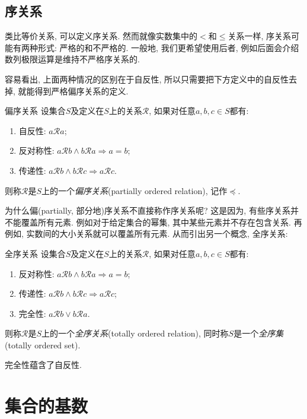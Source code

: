\subsection{序关系}

类比等价关系, 可以定义序关系. 然而就像实数集中的$<$和$\leq$关系一样, 序关系可能有两种形式: 严格的和不严格的. 一般地, 我们更希望使用后者, 例如后面会介绍数列极限运算是维持不严格序关系的. 

容易看出, 上面两种情况的区别在于自反性, 所以只需要把下方定义中的自反性去掉, 就能得到严格偏序关系的定义. 

\begin{definition}{偏序关系}
	设集合$S$及定义在$S$上的关系$\mathcal{R}$, 如果对任意$a, b, c \in S$都有: 
	\begin{enumerate}
		\item 自反性: $a\mathcal{R} a$; 
		\item 反对称性: $a\mathcal{R} b \wedge b\mathcal{R} a \Rightarrow a=b$; 
		\item 传递性: $a\mathcal{R} b \wedge b\mathcal{R} c \Rightarrow a\mathcal{R} c$.
	\end{enumerate}
	则称$\mathcal{R}$是$S$上的一个\textit{偏序关系}(partially ordered relation), 记作$\preceq$.
\end{definition}

为什么偏(partially, 部分地)序关系不直接称作序关系呢? 这是因为, 有些序关系并不能覆盖所有元素. 例如对于给定集合的幂集, 其中某些元素并不存在包含关系. 再例如, 实数间的大小关系就可以覆盖所有元素. 从而引出另一个概念, 全序关系: 

\begin{definition}{全序关系}
	设集合$S$及定义在$S$上的关系$\mathcal{R}$, 如果对任意$a, b, c \in S$都有: 
	\begin{enumerate}
		\item 反对称性: $a\mathcal{R} b \wedge b\mathcal{R} a \Rightarrow a=b$; 
		\item 传递性: $a\mathcal{R} b \wedge b\mathcal{R} c \Rightarrow a\mathcal{R} c$; 
		\item 完全性: $a\mathcal{R} b \vee b\mathcal{R} a$.
	\end{enumerate}
	则称$\mathcal{R}$是$S$上的一个\textit{全序关系}(totally ordered relation), 同时称$S$是一个\textit{全序集}(totally ordered set).
\end{definition}
\begin{remark}
	完全性蕴含了自反性.
\end{remark}

\newpage
\section{集合的基数}

